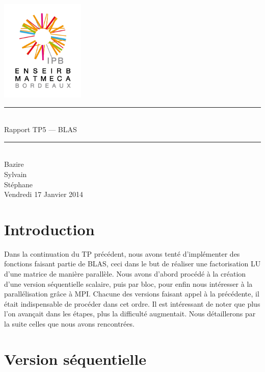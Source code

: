 \documentclass[a4paper,11pt]{article}
\begin{document}
\begin{titlepage}
  \begin{center}

    \begin{center}
      \includegraphics[width=4cm]{EM.jpg}
    \end{center}

    \vspace*{1cm}
        
    \rule{0.75\linewidth}{0.7mm}\\[0.4cm]
    {\Huge Rapport TP5 --- BLAS\\[0.4cm]}
    \rule{0.75\linewidth}{0.7mm} \\[1.5cm]

    {\Large Bazire \\Sylvain {}\\Stéphane \\[2cm]}
    {\Large Vendredi 17 Janvier 2014}
  \end{center}
\end{titlepage}

\tableofcontents
\clearpage
\section{Introduction}

Dans la continuation du TP précédent, nous avons tenté d'implémenter des fonctions faisant partie de BLAS, ceci dans le but de réaliser une factorisation LU d'une matrice de manière parallèle. Nous avons d'abord procédé à la création d'une version séquentielle scalaire, puis par bloc, pour enfin nous intéresser à la parallélisation grâce à MPI. Chacune des versions faisant appel à la précédente, il était indispensable de procéder dans cet ordre. Il est intéressant de noter que plus l'on avançait dans les étapes, plus la difficulté augmentait. Nous détaillerons par la suite celles que nous avons rencontrées.

\section{Version séquentielle}
\end{document}
